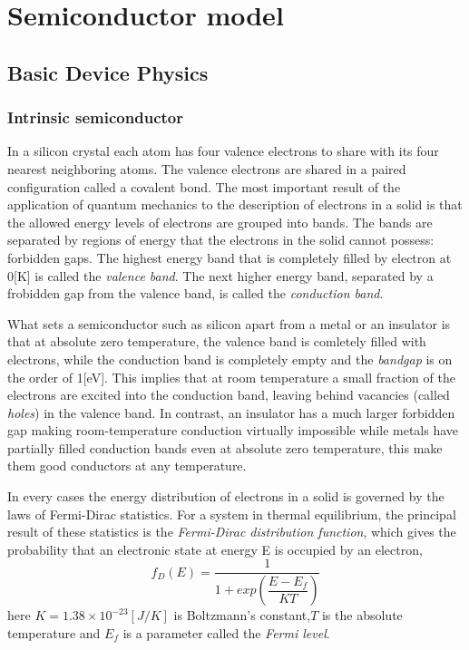 \chapter{Semiconductor model}

\section{Basic Device Physics}

\subsection{Intrinsic semiconductor}
In a silicon crystal each atom has four valence electrons to share with its four nearest neighboring atoms. The valence electrons are shared in a paired configuration called a covalent bond. The most important result of the application of quantum mechanics to the description of electrons in a solid is that the allowed energy levels of electrons are grouped into bands. The bands are separated by regions of energy that the electrons in the solid cannot possess: forbidden gaps. The highest energy band that is completely filled by electron at 0[K] is called the \textit{valence band}. The next higher energy band, separated by a frobidden gap from the valence band, is called the \textit{conduction band}.

What sets a semiconductor such as silicon apart from a metal or an insulator is that at absolute zero temperature, the valence band is comletely filled with electrons, while the conduction band is completely empty and the \textit{bandgap} is on the order of 1[eV].
This implies that at room temperature a small fraction of the electrons are excited into the conduction band, leaving behind vacancies (called \textit{holes}) in the valence band.
In contrast, an insulator has a much larger forbidden gap making room-temperature conduction virtually impossible while metals have partially filled conduction bands even at absolute zero temperature, this make them good conductors at any temperature.

In every cases the energy distribution of electrons in a solid is governed by the laws of Fermi-Dirac statistics. For a system in thermal equilibrium, the principal result of these statistics is the \textit{Fermi-Dirac distribution function}, which gives the probability that an electronic state at energy E is occupied by an electron,
\begin{equation}
\label{eq: fermi dirac distribution}
f_D(E) = \dfrac{1}{1+exp\left(\dfrac{E-E_f}{KT}\right)} 
\end{equation}
here $K=1.38\times10^{-23}[J/K]$ is Boltzmann's constant,$T$ is the absolute temperature and $E_f$ is a parameter called the \textit{Fermi level}.


